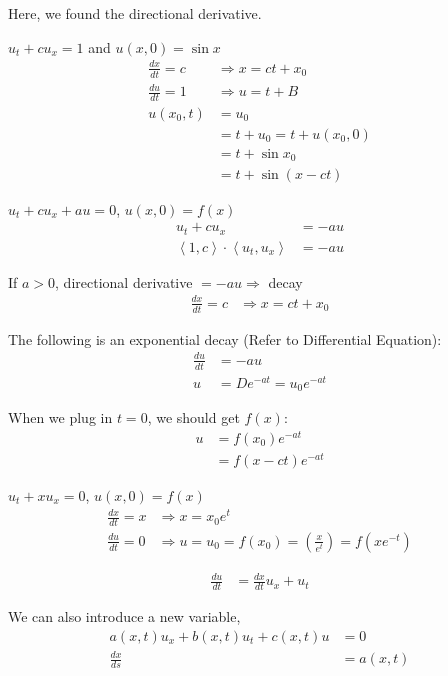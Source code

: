   Here, we found the directional derivative.

  \ex $u_t + cu_x = 1$ and $u(x, 0) = \sin x$
  \begin{align}
    \frac{dx}{dt} = c & \Rightarrow x = ct + x_0\\
    \frac{du}{dt} = 1 & \Rightarrow u = t + B\\
    u(x_0, t) & = u_0\\
    & = t + u_0 = t + u(x_0, 0)\\
    & = t + \sin x_0\\
    & = t + \sin(x - ct)
  \end{align}

  \ex $u_t + cu_x + au = 0$, $u(x, 0) = f(x)$
  \begin{align}
    u_t + cu_x & = -au\\
    \left< 1, c \right> \cdot \left< u_t, u_x \right> & = -au
  \end{align}

  If $a > 0$, directional derivative $= -au \Rightarrow$ decay
  \begin{align}
    \frac{dx}{dt} = c & \Rightarrow x = ct + x_0
  \end{align}

  The following is an exponential decay (Refer to Differential Equation):
  \begin{align}
    \frac{du}{dt} & = -au\\
    u & = De^{-at} = u_0 e^{-at}
  \end{align}

  When we plug in $t = 0$, we should get $f(x)$:
  \begin{align}
    u & = f(x_0) e^{-at}\\
    & = f(x - ct) e^{-at}
  \end{align}

  \ex $u_t + xu_x = 0$, $u(x, 0) = f(x)$
  \begin{align}
    \frac{dx}{dt} = x & \Rightarrow x = x_0 e^t\\
    \frac{du}{dt} = 0 & \Rightarrow u = u_0 = f(x_0) = \left(\frac{x}{e^t}\right)
    = f(xe^{-t})
  \end{align}

  \begin{align}
    \frac{du}{dt} & = \frac{dx}{dt} u_x + u_t
  \end{align}

  We can also introduce a new variable,
  \begin{align}
    a(x, t) u_x + b(x, t) u_t + c(x, t) u & = 0\\
    \frac{dx}{ds} & = a(x, t)
  \end{align}

